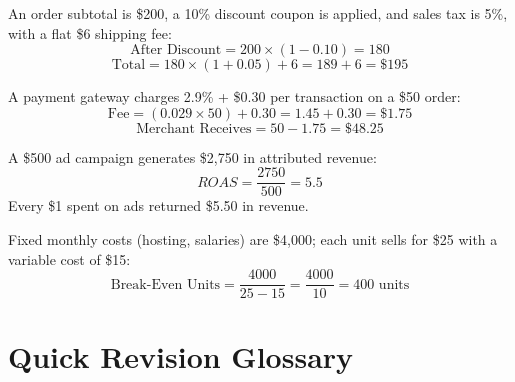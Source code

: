 \documentclass[11pt,a4paper]{article}
\begin{document}
\begin{examplebox}
An order subtotal is \$200, a 10\% discount coupon is applied, and sales tax is 5\%, with a flat \$6 shipping fee:
$$
\text{After Discount} = 200 \times (1 - 0.10) = 180
$$
$$
\text{Total} = 180 \times (1 + 0.05) + 6 = 189 + 6 = \$195
$$
\end{examplebox}

\begin{examplebox}
A payment gateway charges 2.9\% + \$0.30 per transaction on a \$50 order:
$$
\text{Fee} = (0.029 \times 50) + 0.30 = 1.45 + 0.30 = \$1.75
$$
$$
\text{Merchant Receives} = 50 - 1.75 = \$48.25
$$
\end{examplebox}

\begin{examplebox}
A \$500 ad campaign generates \$2,750 in attributed revenue:
$$
ROAS = \frac{2750}{500} = 5.5
$$
Every \$1 spent on ads returned \$5.50 in revenue.
\end{examplebox}

\begin{examplebox}
Fixed monthly costs (hosting, salaries) are \$4,000; each unit sells for \$25 with a variable cost of \$15:
$$
\text{Break-Even Units} = \frac{4000}{25 - 15} = \frac{4000}{10} = 400 \text{ units}
$$
\end{examplebox}

\section{Quick Revision Glossary}
\end{document}
